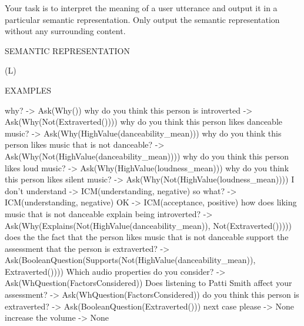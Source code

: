 
\begin{prompt}
Your task is to interpret the meaning of a user utterance and output it in a particular semantic representation. Only output the semantic representation without any surrounding content.

SEMANTIC REPRESENTATION

(L)

EXAMPLES

why? -> Ask(Why())
why do you think this person is introverted -> Ask(Why(Not(Extraverted())))
why do you think this person likes danceable music? -> Ask(Why(HighValue(danceability_mean)))
why do you think this person likes music that is not danceable? -> Ask(Why(Not(HighValue(danceability_mean))))
why do you think this person likes loud music? -> Ask(Why(HighValue(loudness_mean)))
why do you think this person likes silent music? -> Ask(Why(Not(HighValue(loudness_mean))))
I don't understand -> ICM(understanding, negative)
so what? -> ICM(understanding, negative)
OK -> ICM(acceptance, positive)
how does liking music that is not danceable explain being introverted? -> Ask(Why(Explains(Not(HighValue(danceability_mean)), Not(Extraverted()))))
does the the fact that the person likes music that is not danceable support the assessment that the person is extraverted? -> Ask(BooleanQuestion(Supports(Not(HighValue(danceability_mean)), Extraverted())))
Which audio properties do you consider? -> Ask(WhQuestion(FactorsConsidered))
Does listening to Patti Smith affect your assessment? -> Ask(WhQuestion(FactorsConsidered))
do you think this person is extraverted? -> Ask(BooleanQuestion(Extraverted()))
next case please -> None
increase the volume -> None
\end{prompt}
